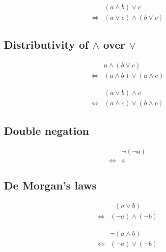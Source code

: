 \begin{prop}
\label{Proposition:lor_land_distributivity_2}
\begin{align*}
& (a \land b) \lor c \\
\iff & (a \lor c) \land (b \lor c)
\end{align*}
\end{prop}

\subsection{Distributivity of $\land$ over $\lor$}
\begin{prop}
\label{Proposition:land_lor_distributivity_1}
\begin{align*}
& a \land (b \lor c) \\
\iff & (a \land b) \lor (a \land c)
\end{align*}
\end{prop}

\begin{prop}
\label{Proposition:land_lor_distributivity_2}
\begin{align*}
& (a \lor b) \land c \\
\iff & (a \land c) \lor (b \land c)
\end{align*}
\end{prop}

\subsection{Double negation}
\begin{prop}
\label{Proposition:double_negation}
\begin{align*}
& \lnot (\lnot a) \\
\iff & a
\end{align*}
\end{prop}

\subsection{De Morgan's laws}
\begin{prop}
\label{Proposition:De_Morgan_lor}
\begin{align*}
& \lnot (a \lor b) \\
\iff & (\lnot a) \land (\lnot b)
\end{align*}
\end{prop}

\begin{prop}
\label{Proposition:De_Morgan_land}
\begin{align*}
& \lnot (a \land b) \\
\iff & (\lnot a) \lor (\lnot b)
\end{align*}
\end{prop}

